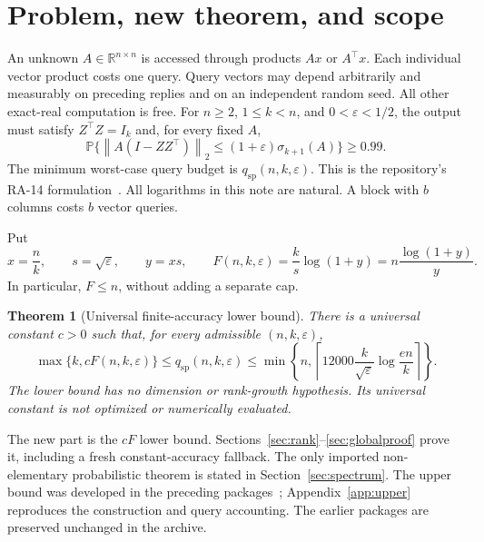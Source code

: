 \documentclass[11pt]{article}
\numberwithin{equation}{section}
\newtheorem{theorem}{Theorem}[section]
\theoremstyle{remark}\newtheorem{remark}[theorem]{Remark}
\newcommand{\R}{\mathbb R}
\newcommand{\Prob}{\mathbb P}
\newcommand{\eps}{\varepsilon}
\newcommand{\qsp}{q_{\mathrm{sp}}}
\newcommand{\norm}[1]{\left\lVert #1\right\rVert}
\begin{document}
\section{Problem, new theorem, and scope}\label{sec:main}
An unknown $A\in\R^{n\times n}$ is accessed through products $Ax$ or $A^\top x$. Each individual vector product costs one query. Query vectors may depend arbitrarily and measurably on preceding replies and on an independent random seed. All other exact-real computation is free. For $n\ge2$, $1\le k<n$, and $0<\eps<1/2$, the output must satisfy $Z^\top Z=I_k$ and, for every fixed $A$,
\begin{equation}\label{eq:target}
\Prob\{\norm{A(I-ZZ^\top)}_2\le(1+\eps)\sigma_{k+1}(A)\}\ge0.99.
\end{equation}
The minimum worst-case query budget is $\qsp(n,k,\eps)$. This is the repository's RA-14 formulation~\cite{repo}. All logarithms in this note are natural. A block with $b$ columns costs $b$ vector queries.

Put
\begin{equation}\label{eq:F}
x=\frac nk,\qquad s=\sqrt\eps,\qquad y=xs,\qquad
F(n,k,\eps)=\frac{k}{s}\log(1+y)
=n\frac{\log(1+y)}{y}.
\end{equation}
In particular, $F\le n$, without adding a separate cap.

\begin{theorem}[Universal finite-accuracy lower bound]\label{thm:global}
There is a universal constant $c>0$ such that, for every admissible $(n,k,\eps)$,
\begin{equation}\label{eq:bracket}
\max\{k,cF(n,k,\eps)\}
\le\qsp(n,k,\eps)
\le\min\!\left\{n,\left\lceil12000\frac{k}{\sqrt\eps}\log\frac{en}{k}\right\rceil\right\}.
\end{equation}
The lower bound has no dimension or rank-growth hypothesis. Its universal constant is not optimized or numerically evaluated.
\end{theorem}
The new part is the $cF$ lower bound. Sections~\ref{sec:rank}--\ref{sec:globalproof} prove it, including a fresh constant-accuracy fallback. The only imported non-elementary probabilistic theorem is stated in Section~\ref{sec:spectrum}. The upper bound was developed in the preceding packages~\cite{prior3,prior4}; Appendix~\ref{app:upper} reproduces the construction and query accounting. The earlier packages are preserved unchanged in the archive.
\end{document}
